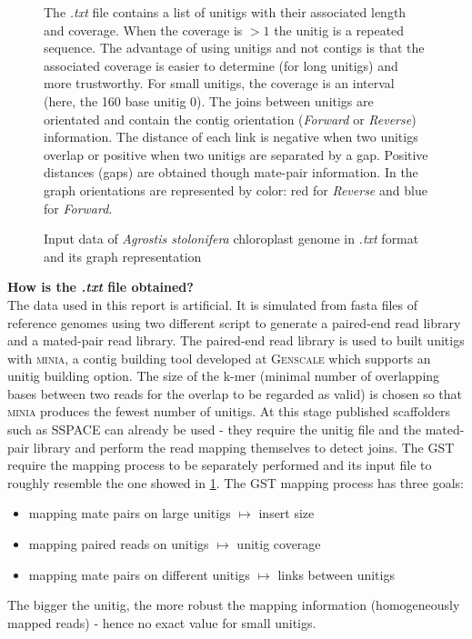\documentclass[12pt]{article}
\begin{document}
\begin{figure}[h!]
{
}
\caption{Input data of \textit{Agrostis stolonifera} chloroplast genome in \textit{.txt} format and its graph representation}
\label{fig:inpagrostis}
\scriptsize The \textit{.txt} file contains a list of unitigs with their associated length and coverage. When the coverage is $>1$ the unitig is a repeated sequence. The advantage of using unitigs and not contigs is that the associated coverage is easier to determine (for long unitigs) and more trustworthy. For small unitigs, the coverage is an interval (here, the 160 base unitig 0). The joins between unitigs are orientated and contain the contig orientation (\textit{Forward} or \textit{Reverse}) information. The distance of each link is negative when two unitigs overlap or positive when two unitigs are separated by a gap. Positive distances (gaps) are obtained though mate-pair information. In the graph orientations are represented by color: red for \textit{Reverse} and blue for \textit{Forward}.
\end{figure}

\vspace{-0.2cm}
\textbf{How is the \textit{.txt} file obtained? }\\
The data used in this report is artificial. It is simulated from fasta files of reference genomes using two different script to generate a paired-end read library and a mated-pair read library. The paired-end read library is used to built unitigs with \textsc{minia}, a contig building tool developed at \textsc{Genscale} which supports an unitig building option. The size of the k-mer (minimal number of overlapping bases between two reads for the overlap to be regarded as valid) is chosen so that \textsc{minia} produces the fewest number of unitigs. At this stage published scaffolders such as SSPACE can already be used - they require the unitig file and the mated-pair library and perform the read mapping themselves to detect joins. The GST require the mapping process to be separately performed and its input file to roughly resemble the one showed in \ref{fig:inpagrostis}. The GST mapping process has three goals:
\begin{itemize}
\item mapping mate pairs on large unitigs $\mapsto$ insert size
\item mapping paired reads on unitigs $\mapsto$ unitig coverage
\item mapping mate pairs on different unitigs $\mapsto$ links between unitigs
\end{itemize}
The bigger the unitig, the more robust the mapping information (homogeneously mapped reads) - hence no exact value for small unitigs.
\end{document}
